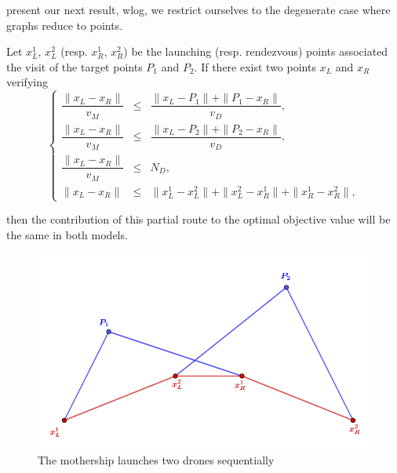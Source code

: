 {%

\noindent
{} present our next result, wlog, we restrict ourselves to the degenerate case where graphs reduce to points. 


\begin{theorem}\label{thm:relationship}
Let $x_L^1$, $x_L^2$ (resp. $x_R^1$, $x_R^2$) be the launching (resp. rendezvous) points associated  the visit of the target points $P_1$ and $P_2$. If there exist two points $x_L$ and $x_R$ verifying 
$$
 \left\{
 \begin{array}{ccl}
  \dfrac{\|x_L-x_R\|}{v_M} & \leq    & \dfrac{\|x_L - P_1\| + \|P_1 - x_R\|}{v_D}, \\
  \dfrac{\|x_L-x_R\|}{v_M} & \leq    & \dfrac{\|x_L - P_2\| + \|P_2 - x_R\|}{v_D}, \\
  \dfrac{\|x_L-x_R\|}{v_M} & \leq   & N_D, \\
  \|x_L-x_R\| & \leq & \|x_L^1 - x_L^2\| + \|x_L^2- x_R^1\| + \|x_R^1-x_R^2\|,
 \end{array}
 \right.
$$

\noindent then the contribution of this partial route to the optimal objective value will be the same in both models.
\end{theorem}
\begin{figure}[h!]
    \centering
    \includegraphics[width = 0.5\linewidth]{proof1.PNG}
    \caption{The mothership launches two drones sequentially}
    \label{fig:proof1}
\end{figure}

}
